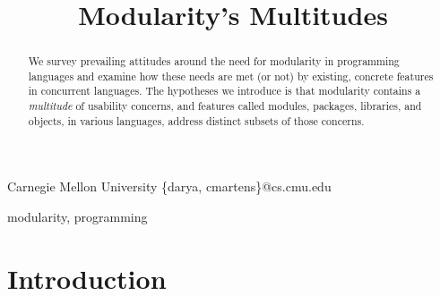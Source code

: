 \documentclass{sigplanconf}[10pt]
\begin{document}
\setlength{\pdfpageheight}{\paperheight}
\setlength{\pdfpagewidth}{\paperwidth}






\title{Modularity's Multitudes}

           {Carnegie Mellon University}
           {\{darya, cmartens\}@cs.cmu.edu}

\maketitle

\begin{abstract}
We survey prevailing attitudes around the need for modularity in
programming languages and examine how these needs are met (or not) by
existing, concrete features in concurrent languages. The hypotheses we introduce
is that modularity contains a {\em multitude} of usability concerns,
and features called modules, packages, libraries, and objects, in various
languages, address distinct subsets of those concerns. 
\end{abstract}



\keywords
modularity, programming

\section{Introduction}
\end{document}
